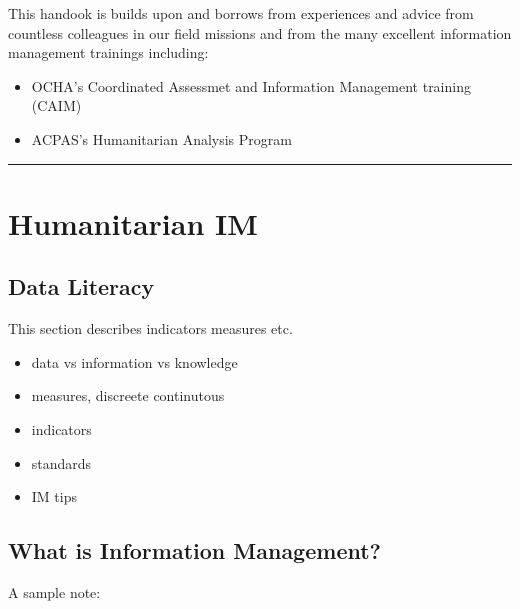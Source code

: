 \documentclass[letterpaper,10pt,english]{jupyterBook}
\begin{document}
\sphinxAtStartPar
{}

\begin{DUlineblock}{0em}
\item[] 
\end{DUlineblock}

\sphinxAtStartPar
This handook is builds upon and borrows from experiences and advice from countless colleagues in our field missions and from the many excellent information management trainings including:
\begin{itemize}
\item {} 
\sphinxAtStartPar
OCHA’s Coordinated Assessmet and Information Management training (CAIM)

\item {} 
\sphinxAtStartPar
ACPAS’s Humanitarian Analysis Program

\end{itemize}


\bigskip\hrule\bigskip



\part{Humanitarian IM}


\chapter{Data Literacy}
\label{\detokenize{part1/data literacy:data-literacy}}\label{\detokenize{part1/data literacy::doc}}
\sphinxAtStartPar
This section describes indicators measures etc.
\begin{itemize}
\item {} 
\sphinxAtStartPar
data vs information vs knowledge

\item {} 
\sphinxAtStartPar
measures, discreete continutous

\item {} 
\sphinxAtStartPar
indicators

\item {} 
\sphinxAtStartPar
standards

\item {} 
\sphinxAtStartPar
IM tips

\end{itemize}


\chapter{What is Information Management?}
\label{\detokenize{part1/what is information management:what-is-information-management}}\label{\detokenize{part1/what is information management::doc}}
\sphinxAtStartPar
A sample note:
\end{document}
